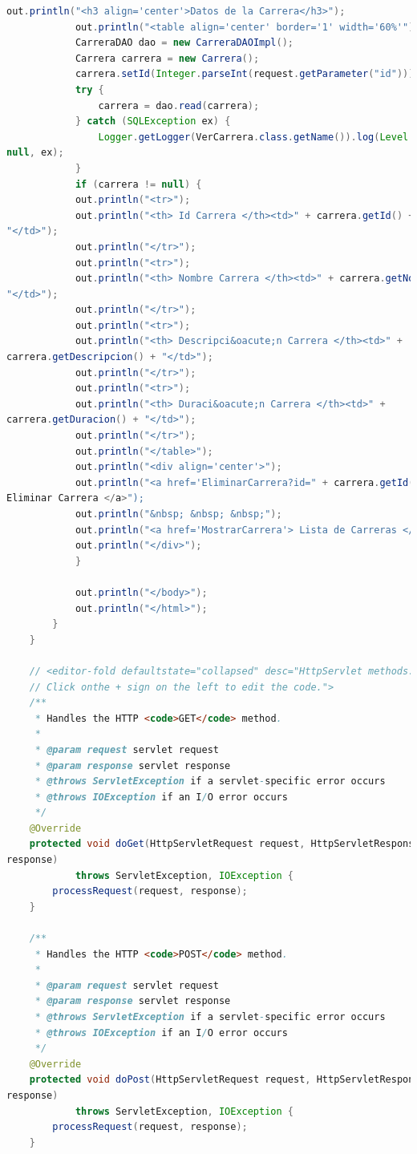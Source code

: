 \documentclass[a4paper,12pt]{article}
\begin{document}
\begin{lstlisting}[language=Java, style=customJava, 
caption={VerCarrera.java},captionpos=b,basicstyle=\fontfamily{cmss}\small]
            out.println("<h3 align='center'>Datos de la Carrera</h3>");
            out.println("<table align='center' border='1' width='60%'");
            CarreraDAO dao = new CarreraDAOImpl();
            Carrera carrera = new Carrera();
            carrera.setId(Integer.parseInt(request.getParameter("id")));
            try {
                carrera = dao.read(carrera);
            } catch (SQLException ex) {
                Logger.getLogger(VerCarrera.class.getName()).log(Level.SEVERE, 
null, ex);
            }
            if (carrera != null) {
            out.println("<tr>");
            out.println("<th> Id Carrera </th><td>" + carrera.getId() + 
"</td>");
            out.println("</tr>");
            out.println("<tr>");
            out.println("<th> Nombre Carrera </th><td>" + carrera.getNombre() + 
"</td>");
            out.println("</tr>");
            out.println("<tr>");
            out.println("<th> Descripci&oacute;n Carrera </th><td>" + 
carrera.getDescripcion() + "</td>");
            out.println("</tr>");
            out.println("<tr>");
            out.println("<th> Duraci&oacute;n Carrera </th><td>" + 
carrera.getDuracion() + "</td>");
            out.println("</tr>");
            out.println("</table>");
            out.println("<div align='center'>");
            out.println("<a href='EliminarCarrera?id=" + carrera.getId() +" '> 
Eliminar Carrera </a>");
            out.println("&nbsp; &nbsp; &nbsp;");
            out.println("<a href='MostrarCarrera'> Lista de Carreras </a>");
            out.println("</div>");
            }

            out.println("</body>");
            out.println("</html>");
        }
    }

    // <editor-fold defaultstate="collapsed" desc="HttpServlet methods. 
    // Click onthe + sign on the left to edit the code.">
    /**
     * Handles the HTTP <code>GET</code> method.
     *
     * @param request servlet request
     * @param response servlet response
     * @throws ServletException if a servlet-specific error occurs
     * @throws IOException if an I/O error occurs
     */
    @Override
    protected void doGet(HttpServletRequest request, HttpServletResponse 
response)
            throws ServletException, IOException {
        processRequest(request, response);
    }

    /**
     * Handles the HTTP <code>POST</code> method.
     *
     * @param request servlet request
     * @param response servlet response
     * @throws ServletException if a servlet-specific error occurs
     * @throws IOException if an I/O error occurs
     */
    @Override
    protected void doPost(HttpServletRequest request, HttpServletResponse 
response)
            throws ServletException, IOException {
        processRequest(request, response);
    }


\end{lstlisting}
\end{document}
